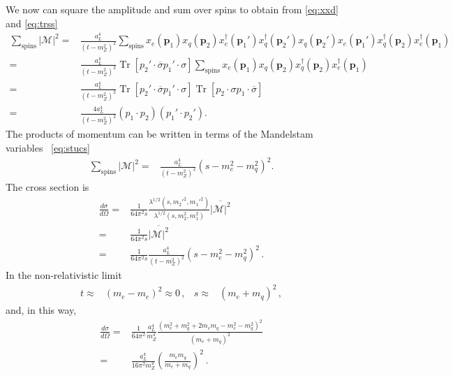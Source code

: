 We now can square the amplitude and sum over spins to obtain from \eqref{eq:xxd} and \eqref{eq:trss}
\begin{align}
  \sum_{\text{spins}} |\mathcal{M}|^2=&
  \frac{a_L^4}{\left( t-m_Z^2 \right)^2}
  \sum_{\text{spins}}x_e(\mathbf{p}_1)x_q(\mathbf{p}_2) x^{\dagger}_e(\mathbf{p}_1')  x^{\dagger}_q(\mathbf{p}_2') 
 x_q(\mathbf{p}_2') x_e(\mathbf{p}_1')  x_q^{\dagger}(\mathbf{p}_2)  x_e^{\dagger}(\mathbf{p}_1) \nonumber\\
  =& \frac{a_L^4}{\left( t-m_Z^2 \right)^2} \operatorname{Tr}\left[p_2'\cdot\overline{\sigma} p_1'\cdot\sigma  \right]
  \sum_{\text{spins}}x_e(\mathbf{p}_1)x_q(\mathbf{p}_2)  x_q^{\dagger}(\mathbf{p}_2)  x_e^{\dagger}(\mathbf{p}_1) \nonumber\\
  =& \frac{a_L^4}{\left( t-m_Z^2 \right)^2} \operatorname{Tr}\left[p_2'\cdot\overline{\sigma} p_1'\cdot\sigma  \right]
 \operatorname{Tr}\left[p_2\cdot\sigma  p_1\cdot\overline{\sigma}  \right] \nonumber\\
  =& \frac{4a_L^4}{\left( t-m_Z^2 \right)^2}\left( p_1\cdot p_2 \right)\left( p_1'\cdot p_2' \right).
\end{align}
The products of momentum can be written in terms of the Mandelstam variables~ \eqref{eq:stucs}
\begin{align}
   \sum_{\text{spins}} |\mathcal{M}|^2=& \frac{a_L^4}{\left( t-m_Z^2 \right)^2}\left( s-m_e^2-m_q^2 \right)^2.
\end{align}
The cross section is 
\begin{align}
     \frac{d\sigma}{d\Omega}=&\frac{1}{64\pi^2s}
\frac{\lambda^{1/2}(s,{m_2'}^2,{m_1'}^2)}{\lambda^{1/2}(s,m_2^2,m_1^2)}
\overline{|\mathcal{M}|^2} \nonumber\\
=&\frac{1}{64\pi^2s}\overline{|\mathcal{M}|^2} \nonumber\\
=&\frac{1}{64\pi^2s}\frac{a_L^4}{\left( t-m_Z^2 \right)^2}\left( s-m_e^2-m_q^2 \right)^2 \,.
\end{align}
In the non-relativistic limit
\begin{align}
  t\approx& (m_e-m_e)^2\approx 0\,,& 
  s\approx& (m_e+m_q)^2\,,
\end{align}
and, in this way,
\begin{align}
       \frac{d\sigma}{d\Omega}=&\frac{1}{64\pi^2}\frac{a_L^4}{m_Z^4}\frac{\left( m_e^2+m_q^2+2m_em_q-m_e^2-m_q^2 \right)^2}{(m_e+m_q)^2} \nonumber\\
                    =&\frac{a_L^4}{16\pi^2m_Z^4}\left( \frac{m_em_q}{m_e+m_q} \right)^2\,.
\end{align}

